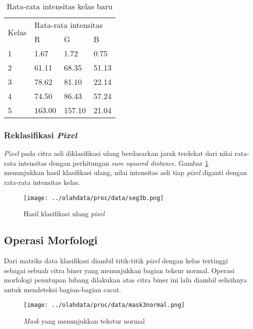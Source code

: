 \documentclass[laporan.tex]{subfiles}
\begin{document}
\begin{table}[h]
\centering
\begin{tabular}{|l|l|l|l|}
\cline{1-4}
\multirow{2}{*}{Kelas} & \multicolumn{3}{l|}{Rata-rata intensitas} \\
\cline{2-4}
 & R & G & B \\
\cline{1-4}
1 & 1.67 & 1.72 & 0.75 \\
2 & 61.11 & 68.35 & 51.13 \\
3 & 78.62 & 81.10 & 22.14 \\
4 & 74.50 & 86.43 & 57.24 \\
5 & 163.00 & 157.10 & 21.04 \\
\cline{1-4}
\end{tabular}
\caption{Rata-rata intensitas kelas baru}
\label{table:newclassavg}
\end{table}

\subsubsection{Reklasifikasi \emph{Pixel}}

\emph{Pixel} pada citra asli diklasifikasi ulang berdasarkan jarak terdekat dari nilai rata-rata intensitas dengan perhitungan \emph{sum squared distance}. Gambar \ref{fig:classfinimg} menunjukkan hasil klasifikasi ulang, nilai intensitas asli tiap \emph{pixel} diganti dengan rata-rata intensitas kelas.

\begin{figure}[h]
\centering
\texttt{[image: ../olahdata/proc/data/seg3b.png]}
\caption{Hasil klasifikasi ulang \emph{pixel}}
\label{fig:classfinimg}
\end{figure}

\subsection{Operasi Morfologi}

Dari matriks data klasifikasi diambil titik-titik \emph{pixel} dengan kelas tertinggi sebagai sebuah citra biner yang menunjukkan bagian teksur normal. Operasi morfologi penutupan lubang dilakukan atas citra biner ini lalu diambil selisihnya untuk mendeteksi bagian-bagian cacat.

\begin{figure}[h]
\centering
\texttt{[image: ../olahdata/proc/data/mask3normal.png]}
\caption{\emph{Mask} yang menunjukkan tekstur normal}
\end{figure}
\end{document}
